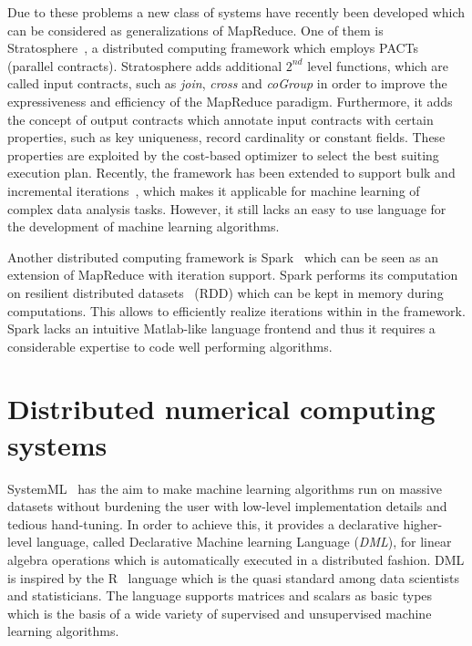 Due to these problems a new class of systems have recently been developed which can be considered as generalizations of MapReduce.
One of them is Stratosphere~\cite{battre:2010a}, a distributed computing framework which employs PACTs~\cite{alexandrov:2011a} (parallel contracts).
Stratosphere adds additional $2^{nd}$ level functions, which are called input contracts, such as \emph{join}, \emph{cross} and \emph{coGroup} in order to improve the expressiveness and efficiency of the MapReduce paradigm.
Furthermore, it adds the concept of output contracts which annotate input contracts with certain properties, such as key uniqueness, record cardinality or constant fields.
These properties are exploited by the cost-based optimizer to select the best suiting execution plan.
Recently, the framework has been extended to support bulk and incremental iterations~\cite{ewen:pve2012a}, which makes it applicable for machine learning of complex data analysis tasks.
However, it still lacks an easy to use language for the development of machine learning algorithms.

Another distributed computing framework is Spark~\cite{zaharia:2010a} which can be seen as an extension of MapReduce with iteration support.
Spark performs its computation on resilient distributed datasets~\cite{zaharia:2012a} (RDD) which can be kept in memory during computations.
This allows to efficiently realize iterations within in the framework.
Spark lacks an intuitive Matlab-like language frontend and thus it requires a considerable expertise to code well performing algorithms.

\section{Distributed numerical computing systems}

SystemML~\cite{ghoting:2011a} has the aim to make machine learning algorithms run on massive datasets without burdening the user with low-level implementation details and tedious hand-tuning.
In order to achieve this, it provides a declarative higher-level language, called Declarative Machine learning Language (\emph{DML}), for linear algebra operations which is automatically executed in a distributed fashion.
DML is inspired by the R~\cite{r:1993a} language which is the quasi standard among data scientists and statisticians.
The language supports matrices and scalars as basic types which is the basis of a wide variety of supervised and unsupervised machine learning algorithms.

